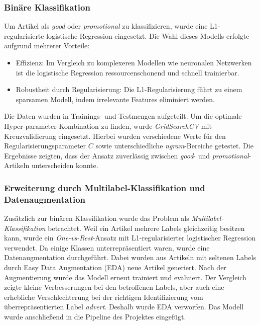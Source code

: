 \subsubsection{Binäre Klassifikation}
Um Artikel als \textit{good} oder \textit{promotional} zu klassifizieren, wurde eine L1-regularisierte logistische Regression eingesetzt. Die Wahl dieses Modells erfolgte aufgrund mehrerer Vorteile:
\begin{itemize}
\item Effizienz: Im Vergleich zu komplexeren Modellen wie neuronalen Netzwerken ist die logistische Regression ressourcenschonend und schnell trainierbar.
\item Robustheit durch Regularisierung: Die L1-Regularisierung führt zu einem sparsamen Modell, indem irrelevante Features eliminiert werden.
\end{itemize} 
Die Daten wurden in Trainings- und Testmengen aufgeteilt. Um die optimale Hyper-parameter-Kombination zu finden, wurde  \textit{GridSearchCV} mit Kreuzvalidierung eingesetzt. Hierbei wurden verschiedene Werte für den Regularisierungsparameter \(C\) sowie unterschiedliche \textit{ngram}-Bereiche getestet. 
Die Ergebnisse zeigten, dass der Ansatz zuverlässig zwischen \textit{good}- und \textit{promotional}-Artikeln unterscheiden konnte. 
\subsubsection{Erweiterung durch Multilabel-Klassifikation und Datenaugmentation}
Zusätzlich zur binären Klassifikation wurde das Problem als \textit{Multilabel-Klassifikation} betrachtet.
Weil ein Artikel mehrere Labels gleichzeitig besitzen kann, wurde ein \textit{One-vs-Rest}-Ansatz mit L1-regularisierter logistischer Regression verwendet.
Da einige Klassen unterrepräsentiert waren, wurde eine Datenaugmentation durchgeführt. Dabei wurden aus Artikeln mit seltenen Labels durch Easy Data Augmentation (EDA) neue Artikel generiert.
Nach der Augmentierung wurde das Modell erneut trainiert und evaluiert. Der Vergleich zeigte kleine Verbesserungen bei den betroffenen Labels, aber auch eine erhebliche Verschlechterung bei der richtigen Identifizierung vom überrepräsentierten Label \textit{advert}. Deshalb wurde EDA verworfen. Das Modell wurde anschließend in die Pipeline des Projektes eingefügt.